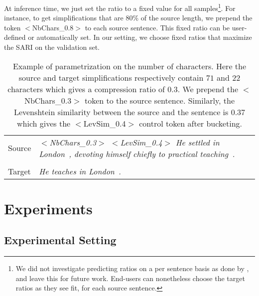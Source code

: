\documentclass[10pt, a4paper]{article}
\begin{document}
At inference time, we just set the ratio to a fixed value for all samples\footnote{We did not investigate predicting ratios on a per sentence basis as done by , and leave this for future work. End-users can nonetheless choose the target ratios as they see fit, for each source sentence.}. For instance, to get simplifications that are 80\% of the source length, we prepend the token $<$NbChars\_0.8$>$ to each source sentence.
This fixed ratio can be user-defined or automatically set.
In our setting, we choose fixed ratios that maximize the SARI on the validation set.


\begin{table}
\small
\centering
\begin{tabular}{p{}p{}}
\toprule
Source& \textit{$<$NbChars\_0.3$>$ $<$LevSim\_0.4$>$  He settled in London~, devoting himself chiefly to practical teaching~.}\\
& \\
Target & \textit{He teaches in London~.}\\
\bottomrule
\end{tabular}
\caption{Example of parametrization on the number of characters. Here the source and target simplifications respectively contain $71$ and $22$ characters which gives a compression ratio of $0.3$. We prepend the $<$NbChars\_0.3$>$ token to the source sentence. Similarly, the Levenshtein similarity between the source and the sentence is 0.37 which gives the $<$LevSim\_0.4$>$ control token after bucketing.}
\label{conditioning_example}
\end{table}


\section{Experiments}

\subsection{Experimental Setting}
\end{document}
